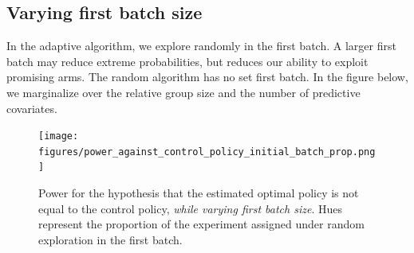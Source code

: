 \documentclass[letterpaper, 12pt, parskip=full,]{scrartcl}
\begin{document}
\subsection{Varying first batch size}
In the adaptive algorithm, we explore randomly in the first batch. A larger first batch may reduce extreme probabilities, but reduces our ability to exploit promising arms. The random algorithm has no set first batch. In the figure below, we marginalize over the relative group size and the number of predictive covariates. 

\begin{figure}[H]
\centering
\texttt{[image: figures/power\_against\_control\_policy\_initial\_batch\_prop.png]}
\caption{Power for the hypothesis that the estimated optimal policy is not equal to the control policy, \textit{while varying first batch size}. Hues represent the proportion of the experiment assigned under random exploration in the first batch. }
\label{fig:power_control_initial_batch_prop}
\end{figure}


%
%
\end{document}
